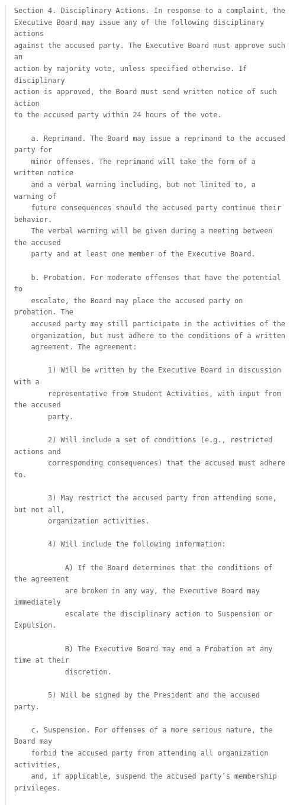 \documentclass{article}
\begin{document}
\begin{quote}
\begin{verbatim}
Section 4. Disciplinary Actions. In response to a complaint, the
Executive Board may issue any of the following disciplinary actions
against the accused party. The Executive Board must approve such an
action by majority vote, unless specified otherwise. If disciplinary
action is approved, the Board must send written notice of such action
to the accused party within 24 hours of the vote.

    a. Reprimand. The Board may issue a reprimand to the accused party for
    minor offenses. The reprimand will take the form of a written notice
    and a verbal warning including, but not limited to, a warning of
    future consequences should the accused party continue their behavior.
    The verbal warning will be given during a meeting between the accused
    party and at least one member of the Executive Board.

    b. Probation. For moderate offenses that have the potential to
    escalate, the Board may place the accused party on probation. The
    accused party may still participate in the activities of the
    organization, but must adhere to the conditions of a written
    agreement. The agreement:

        1) Will be written by the Executive Board in discussion with a
        representative from Student Activities, with input from the accused
        party.

        2) Will include a set of conditions (e.g., restricted actions and
        corresponding consequences) that the accused must adhere to.

        3) May restrict the accused party from attending some, but not all,
        organization activities.

        4) Will include the following information:

            A) If the Board determines that the conditions of the agreement
            are broken in any way, the Executive Board may immediately
            escalate the disciplinary action to Suspension or Expulsion.

            B) The Executive Board may end a Probation at any time at their
            discretion.

        5) Will be signed by the President and the accused party.

    c. Suspension. For offenses of a more serious nature, the Board may
    forbid the accused party from attending all organization activities,
    and, if applicable, suspend the accused party’s membership privileges.


\end{verbatim}
\end{quote}
\end{document}
